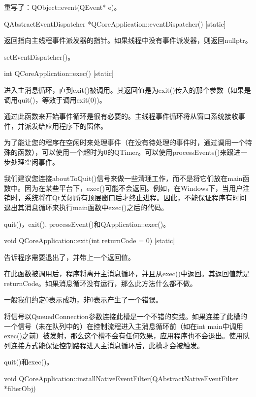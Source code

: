 重写了：QObject::event(QEvent* e)。

QAbstractEventDispatcher *QCoreApplication::eventDispatcher() [static]

返回指向主线程事件派发器的指针。如果线程中没有事件派发器，则返回nullptr。



\begin{seeAlso}
 setEventDispatcher()。
\end{seeAlso}

int QCoreApplication::exec() [static]

进入主消息循环，直到exit()被调用。其返回值是为exit()传入的那个参数（如果是调用quit()，等效于调用exit(0))。

通过此函数来开始事件循环是很有必要的。主线程事件循环将从窗口系统接收事件，并派发给应用程序下的窗体。

为了能让您的程序在空闲时来处理事件（在没有待处理的事件时，通过调用一个特殊的函数），可以使用一个超时为0的QTimer。可以使用processEvents()来跟进一步处理空闲事件。

我们建议您连接aboutToQuit()信号来做一些清理工作，而不是将它们放在main函数中。因为在某些平台下，exec()可能不会返回。例如，在Windows下，当用户注销时，系统将在Qt关闭所有顶层窗口后才终止进程。因此，不能保证程序有时间退出其消息循环来执行main函数中exec()之后的代码。


\begin{seeAlso}
quit()，exit(), processEvent()和QApplication::exec()。
\end{seeAlso}

void QCoreApplication::exit(int returnCode = 0) [static]

告诉程序需要退出了，并带上一个返回值。

在此函数被调用后，程序将离开主消息循环，并且从exec()中返回。其返回值就是returnCode。如果消息循环没有运行，那么此方法什么都不做。

一般我们约定0表示成功，非0表示产生了一个错误。

将信号以QueuedConnection参数连接此槽是一个不错的实践。如果连接了此槽的一个信号（未在队列中的）在控制流程进入主消息循环前（如在int main中调用exec()之前）被发射，那么这个槽不会有任何效果，应用程序也不会退出。使用队列连接方式能保证控制路程进入主消息循环后，此槽才会被触发。


\begin{seeAlso}
quit()和exec()。
\end{seeAlso}

void QCoreApplication::installNativeEventFilter(QAbstractNativeEventFilter *filterObj)


